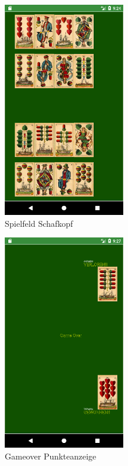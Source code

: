 \begin{figure}[h]
	\centering
	\includegraphics{resources/kartenscreens/board}
	\caption{Spielfeld Schafkopf}
	\label{fig:schafkopf}
\end{figure}

\begin{figure}[h]
	\centering
	\includegraphics{resources/kartenscreens/gameover}
	\caption{Gameover Punkteanzeige}
	\label{fig:schafkopf_gameover}
\end{figure}
